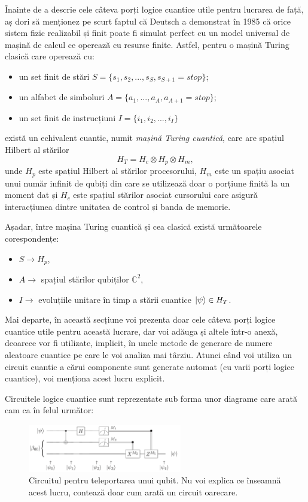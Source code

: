 Înainte de a descrie cele câteva porți logice cuantice utile pentru lucrarea de față, aș dori să menționez pe scurt faptul că Deutsch a demonstrat în 1985 \cite{art:Deutsch:QuantumTT:1985} că orice sistem fizic realizabil și finit poate fi simulat perfect cu un model universal de mașină de calcul ce operează cu resurse finite.
Astfel, pentru o mașină Turing clasică care operează cu:
\begin{itemize}
    \item un set finit de stări $S = \{s_1, s_2, ..., s_S, s_{S+1} = {stop}\}$;
    \item un alfabet de simboluri $A = \{a_1, ..., a_A, a_{A+1} = {stop}\}$;
    \item un set finit de instrucțiuni $I = \{i_1, i_2, ... , i_I\}$
\end{itemize}

există un echivalent cuantic, numit \textit{mașină Turing cuantică}, care are spațiul Hilbert al stărilor 
\[
H_T = H_c \otimes H_p \otimes H_m,
\]
unde $H_p$  este spațiul Hilbert al stărilor procesorului, $H_m$ este un spațiu asociat unui număr infinit de qubiți din care se utilizează doar o porțiune finită la un moment dat și $H_c$ este spațiul stărilor asociat cursorului care asigură interacțiunea dintre unitatea de control și banda de memorie.

Așadar, între mașina Turing cuantică și cea clasică există următoarele corespondențe:
\begin{itemize}
    \item $S \rightarrow H_p$,
    \item $A \rightarrow$ spațiul stărilor qubiților $\mathbb{C}^2$,
    \item $I \rightarrow$ evoluțiile unitare în timp a stării cuantice $\ket{\psi} \in H_T$.
\end{itemize}

Mai departe, în această secțiune voi prezenta doar cele câteva porți logice cuantice utile pentru această lucrare, dar voi adăuga și altele într-o anexă, deoarece vor fi utilizate, implicit, în unele metode de generare de numere aleatoare cuantice pe care le voi analiza mai târziu. Atunci când voi utiliza un circuit cuantic a cărui componente sunt generate automat (cu varii porți logice cuantice), voi menționa acest lucru explicit.

Circuitele logice cuantice sunt reprezentate sub forma unor diagrame care arată cam ca în felul următor:
\begin{figure}[H]
    \centering
    \includegraphics[width=0.6\textwidth]{continut/capitol1/figuri/TeleportationCircuit.png}
    \caption{Circuitul pentru teleportarea unui qubit. Nu voi explica ce înseamnă acest lucru, contează doar cum arată un circuit oarecare.}
    \label{fig:CircuitOarecare}
\end{figure}

